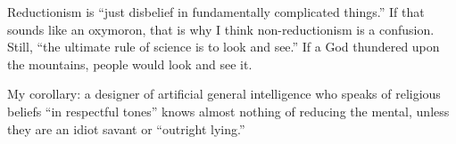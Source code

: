Reductionism is ``just disbelief in fundamentally complicated things.'' If that sounds like an oxymoron, that is why I think non-reductionism is a confusion. Still, ``the ultimate rule of science is to look and see.'' If a God thundered upon the mountains, people would look and see it.

My corollary: a designer of artificial general intelligence who speaks of religious beliefs ``in respectful tones'' knows almost nothing of reducing the mental, unless they are an idiot savant or ``outright lying.'' 
